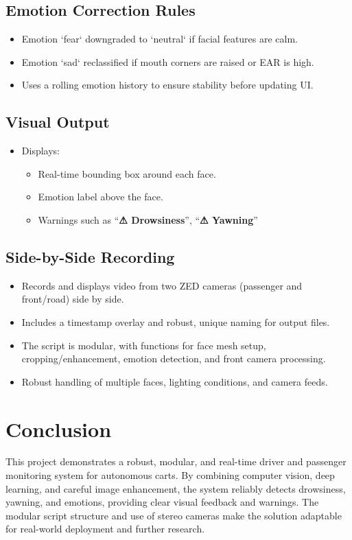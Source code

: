 \documentclass[12pt]{article}
\begin{document}
\subsection{Emotion Correction Rules}
\begin{itemize}
    \item Emotion `fear` downgraded to `neutral` if facial features are calm.
    \item Emotion `sad` reclassified if mouth corners are raised or EAR is high.
    \item Uses a rolling emotion history to ensure stability before updating UI.
\end{itemize}
\subsection{Visual Output}
\begin{itemize}
    \item Displays:
    \begin{itemize}
        \item Real-time bounding box around each face.
        \item Emotion label above the face.
        \item Warnings such as ``\textbf{⚠ Drowsiness}'', ``\textbf{⚠ Yawning}''
    \end{itemize}
\end{itemize}
\subsection{Side-by-Side Recording}
\begin{itemize}
    \item Records and displays video from two ZED cameras (passenger and front/road) side by side.
    \item Includes a timestamp overlay and robust, unique naming for output files.
    \item The script is modular, with functions for face mesh setup, cropping/enhancement, emotion detection, and front camera processing.
    \item Robust handling of multiple faces, lighting conditions, and camera feeds.
\end{itemize}

\section{Conclusion}
This project demonstrates a robust, modular, and real-time driver and passenger monitoring system for autonomous carts. By combining computer vision, deep learning, and careful image enhancement, the system reliably detects drowsiness, yawning, and emotions, providing clear visual feedback and warnings. The modular script structure and use of stereo cameras make the solution adaptable for real-world deployment and further research.
\end{document}
